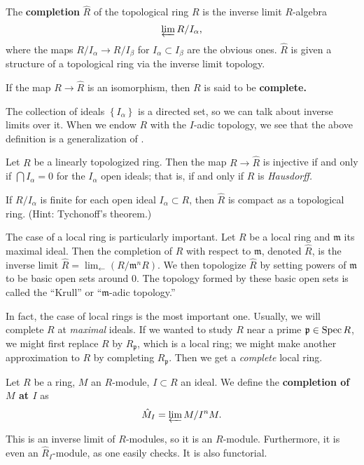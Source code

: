 \begin{definition} 
The \textbf{completion} $\hat{R}$ of the topological ring $R$ is the inverse limit
$R$-algebra
\[ \varprojlim R/I_\alpha,  \]
where the maps $R/I_\alpha \to R/I_\beta$ for $I_\alpha \subset I_\beta$ are
the obvious ones. $\hat{R}$ is given a structure of a topological ring via the
inverse limit topology.

If the map $R \to \hat{R}$ is an isomorphism, then $R$ is said to be
\textbf{complete.}
\end{definition} 

The collection of ideals $\left\{I_\alpha\right\}$ is a directed set, so we
can talk about inverse limits over it. 
When we endow $R$ with the $I$-adic topology, we see that the above definition
is a generalization of .

\begin{exercise} 
Let $R$ be a linearly topologized ring. Then the map $R \to \hat{R}$ is injective if
and only if $\bigcap I_\alpha = 0$ for the $I_\alpha$ open ideals; that is, if
and only if $R$ is \emph{Hausdorff.}
\end{exercise} 

\begin{exercise} 
If $R/I_\alpha$ is finite for each open ideal $I_\alpha \subset R$, then
$\hat{R}$ is compact as a topological ring. (Hint: Tychonoff's theorem.)
\end{exercise} 


The case of a local ring is particularly
important. Let $R$ be a local ring and $\mathfrak{m}$ its maximal ideal. Then
the completion of $R$ with respect to $\mathfrak{m}$, denoted $\hat{R}$, is the inverse limit 
$
\hat{R}=\lim_{\leftarrow}(R/\mathfrak{m}^nR)$.  We then topologize $\hat{R}$ by setting powers of $\mathfrak{m}$ to be basic open sets around $0$. The topology formed by these basic open sets is called the ``Krull'' or ``$\mathfrak{m}$-adic topology.''

In fact, the case of local rings is the most important one.
Usually, we will complete $R$ at \emph{maximal} ideals.
If we wanted to study $R$ near a prime $\mathfrak{p} \in \operatorname{Spec} R$, we might
first replace $R$ by $R_{\mathfrak{p}}$, which is a local ring; we might
make another approximation to $R$ by completing $R_{\mathfrak{p}}$. Then we
get a \emph{complete} local ring.

\begin{definition} 
Let $R$ be a ring, $M$ an $R$-module, $I \subset R$ an ideal. We define the
\textbf{completion of $M$ at $I$} as 
\[ \hat{M}_I =  \varprojlim M/I^n M.  \]

This is an inverse limit of $R$-modules, so it is an $R$-module. Furthermore,
it is even an $\hat{R}_I$-module, as one easily checks. It is also functorial.
\end{definition} 

